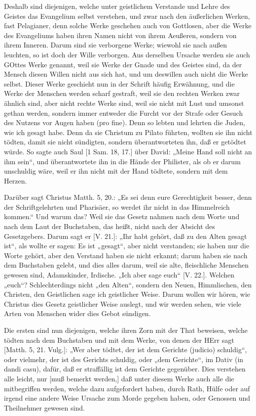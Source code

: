 Deshalb sind diejenigen, welche unter geistlichem Verstande und Lehre des Geistes das Evangelium selbst verstehen, und zwar nach den äußerlichen Werken, fast Pelagianer, denn solche Werke geschehen auch von Gottlosen, aber die Werke des Evangeliums haben ihren Namen nicht von ihrem Aeußeren, sondern von ihrem Inneren. Darum sind sie verborgene Werke; wiewohl sie nach außen leuchten, so ist doch der Wille verborgen. Aus derselben Ursache werden sie auch GOttes Werke genannt, weil sie Werke der Gnade und des Geistes sind, da der Mensch diesen Willen nicht aus sich hat, und um deswillen auch nicht die Werke selbst. Dieser Werke geschieht nun in der Schrift häufig Erwähnung, und die Werke der Menschen werden scharf gestraft, weil sie den rechten Werken zwar ähnlich sind, aber nicht rechte Werke sind, weil sie nicht mit Lust und umsonst gethan werden, sondern immer entweder die Furcht vor der Strafe oder Gesuch des Nutzens vor Augen haben (pro fine). Denn so lebten und lehrten die Juden, wie ich gesagt habe. Denn da sie Christum zu Pilato führten, wollten sie ihn nicht tödten, damit sie nicht sündigten, sondern überantworteten ihn, daß er getödtet würde. So sagte auch Saul [1 Sam. 18, 17.] über David: „Meine Hand soll nicht an ihm sein“, und überantwortete ihn in die Hände der Philister, als ob er darum unschuldig wäre, weil er ihn nicht mit der Hand tödtete, sondern mit dem Herzen.

Darüber sagt Christus Matth. 5, 20.: „Es sei denn eure Gerechtigkeit besser, denn der Schriftgelehrten und Pharisäer, so werdet ihr nicht in das Himmelreich kommen.“ Und warum das? Weil sie das Gesetz nahmen nach dem Worte und nach dem Laut der Buchstaben, das heißt, nicht nach der Absicht des Gesetzgebers. Darum sagt er [V. 21.]: „Ihr habt gehört, daß zu den Alten gesagt ist“, als wollte er sagen: Es ist „gesagt“, aber nicht verstanden; sie haben nur die Worte gehört, aber den Verstand haben sie nicht erkannt; darum haben sie nach dem Buchstaben gelebt, und dies alles darum, weil sie alte, fleischliche Menschen gewesen sind, Adamskinder, Irdische. „Ich aber sage euch“ [V. 22.]. Welchen „euch“? Schlechterdings nicht „den Alten“, sondern den Neuen, Himmlischen, den Christen, den Geistlichen sage ich geistlicher Weise. Darum wollen wir hören, wie Christus dies Gesetz geistlicher Weise auslegt, und wir werden sehen, wie viele Arten von Menschen wider dies Gebot sündigen.

Die ersten sind nun diejenigen, welche ihren Zorn mit der That beweisen, welche tödten nach dem Buchstaben und mit dem Werke, von denen der HErr sagt [Matth. 5, 21. Vulg.]: „Wer aber tödtet, der ist dem Gerichte (judicio) schuldig“, oder vielmehr, der ist des Gerichts schuldig, oder „dem Gerichte“, im Dativ (in dandi casu), dafür, daß er straffällig ist dem Gerichte gegenüber. Dies verstehen alle leicht, nur [muß bemerkt werden,] daß unter diesem Werke auch alle die mitbegriffen werden, welche dazu aufgefordert haben, durch Rath, Hülfe oder auf irgend eine andere Weise Ursache zum Morde gegeben haben, oder Genossen und Theilnehmer gewesen sind.

